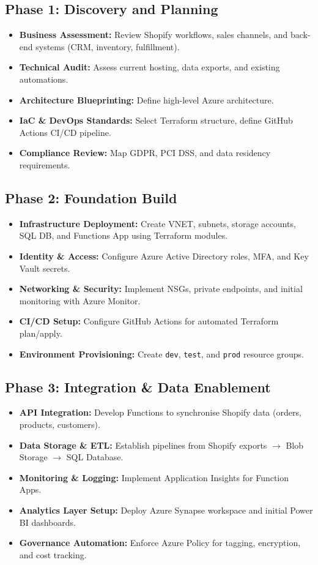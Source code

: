 \documentclass[12pt, a4paper, twoside]{article} %
\begin{document}
\subsection*{Phase 1: Discovery and Planning}
\begin{itemize}
\item \textbf{Business Assessment:} Review Shopify workflows, sales channels, and back-end systems (CRM, inventory, fulfillment).
\item \textbf{Technical Audit:} Assess current hosting, data exports, and existing automations.
\item \textbf{Architecture Blueprinting:} Define high-level Azure architecture.
\item \textbf{IaC \& DevOps Standards:} Select Terraform structure, define GitHub Actions CI/CD pipeline.
\item \textbf{Compliance Review:} Map GDPR, PCI DSS, and data residency requirements.
\end{itemize}

\subsection*{Phase 2: Foundation Build}
\begin{itemize}
\item \textbf{Infrastructure Deployment:} Create VNET, subnets, storage accounts, SQL DB, and Functions App using Terraform modules.
\item \textbf{Identity \& Access:} Configure Azure Active Directory roles, MFA, and Key Vault secrets.
\item \textbf{Networking \& Security:} Implement NSGs, private endpoints, and initial monitoring with Azure Monitor.
\item \textbf{CI/CD Setup:} Configure GitHub Actions for automated Terraform plan/apply.
\item \textbf{Environment Provisioning:} Create \texttt{dev}, \texttt{test}, and \texttt{prod} resource groups.
\end{itemize}

\subsection*{Phase 3: Integration \& Data Enablement}
\begin{itemize}
\item \textbf{API Integration:} Develop Functions to synchronise Shopify data (orders, products, customers).
\item \textbf{Data Storage \& ETL:} Establish pipelines from Shopify exports $\rightarrow$ Blob Storage $\rightarrow$ SQL Database.
\item \textbf{Monitoring \& Logging:} Implement Application Insights for Function Apps.
\item \textbf{Analytics Layer Setup:} Deploy Azure Synapse workspace and initial Power BI dashboards.
\item \textbf{Governance Automation:} Enforce Azure Policy for tagging, encryption, and cost tracking.
\end{itemize}
\end{document}
